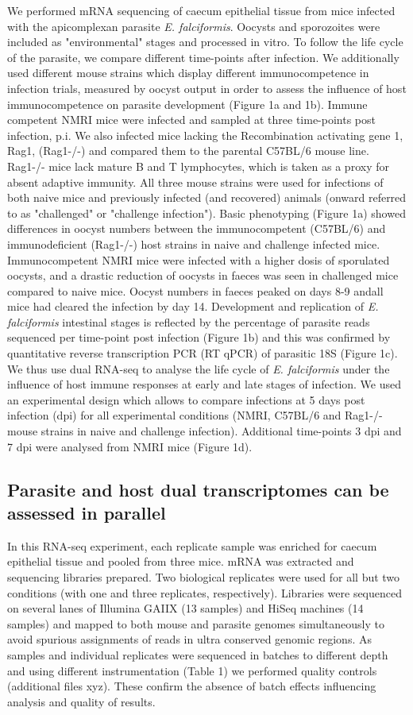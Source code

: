 \documentclass{bmcart}
\begin{document}
We performed mRNA sequencing of caecum epithelial tissue from mice infected with
the apicomplexan parasite \textit{E. falciformis}. Oocysts and
sporozoites were included as "environmental" stages and processed
in vitro. To follow the life cycle of the parasite, we
compare different time-points after infection. We additionally used different mouse strains which display different immunocompetence in infection trials, measured by oocyst output in order to assess the influence of host immunocompetence on parasite development (Figure 1a and 1b). Immune competent NMRI mice were infected and sampled at three time-points post infection, p.i. We also infected mice lacking the Recombination activating gene 1, Rag1, (Rag1-/-) and compared them to the parental C57BL/6 mouse line. Rag1-/- mice lack mature B and T lymphocytes, which is taken as a proxy for absent adaptive immunity. All three mouse strains were used for infections of both naive mice and previously infected (and recovered) animals (onward referred to as "challenged" or "challenge infection").
Basic phenotyping (Figure 1a) showed differences in oocyst numbers between the immunocompetent (C57BL/6) and immunodeficient (Rag1-/-) host strains in naive and challenge infected mice. Immunocompetent NMRI mice were infected with a higher dosis of sporulated oocysts, and a drastic reduction of oocysts in faeces was seen in challenged mice compared to naive mice. Oocyst numbers in faeces peaked on days 8-9 andall mice had cleared the infection by day 14. Development and replication of \textit{E. falciformis} intestinal stages is reflected by the percentage of parasite reads sequenced per time-point post infection (Figure 1b) and this was confirmed by quantitative reverse transcription PCR (RT qPCR) of parasitic 18S (Figure 1c).
We thus use dual RNA-seq to analyse the life cycle of \textit{E. falciformis} under
the influence of host immune responses at early and late stages of infection. We used an experimental
design which allows to compare infections at 5 days post infection (dpi) for all experimental
conditions (NMRI, C57BL/6 and Rag1-/- mouse strains in naive and challenge infection). Additional time-points 3 dpi and 7 dpi were analysed from NMRI mice (Figure 1d).

\subsection*{Parasite and host dual transcriptomes can be assessed in parallel}
In this RNA-seq experiment, each replicate sample was enriched for caecum epithelial tissue and pooled 
from three mice. mRNA was extracted and sequencing libraries prepared. Two biological replicates were used for all but two conditions (with one and three replicates, respectively). Libraries were sequenced on several lanes of Illumina GAIIX (13 samples) and HiSeq machines (14 samples) and mapped to both mouse and parasite genomes simultaneously to avoid spurious assignments of reads in ultra conserved genomic regions. As samples and individual replicates were sequenced in batches to different depth and using different instrumentation (Table 1) we performed quality controls (additional files xyz). These confirm the absence of batch effects influencing analysis and quality of results. 
\end{document}
